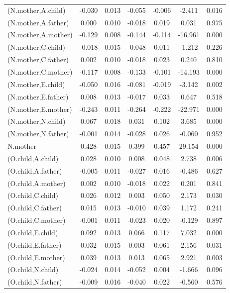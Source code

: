 \documentclass[11pt,a5paper,twoside]{book}
\begin{document}
\begin{center}
\begin{longtable}{lcccccc}
   (N.mother,A.child)  & -0.030 & 0.013 & -0.055 & -0.006 & -2.411 & 0.016 \\ 
   (N.mother,A.father)  & 0.000 & 0.010 & -0.018 & 0.019 & 0.031 & 0.975 \\ 
   (N.mother,A.mother)  & -0.129 & 0.008 & -0.144 & -0.114 & -16.961 & 0.000 \\ 
   (N.mother,C.child)  & -0.018 & 0.015 & -0.048 & 0.011 & -1.212 & 0.226 \\ 
   (N.mother,C.father)  & 0.002 & 0.010 & -0.018 & 0.023 & 0.240 & 0.810 \\ 
  (N.mother,C.mother)  & -0.117 & 0.008 & -0.133 & -0.101 & -14.193 & 0.000 \\ 
   (N.mother,E.child)  & -0.050 & 0.016 & -0.081 & -0.019 & -3.142 & 0.002 \\ 
   (N.mother,E.father)  & 0.008 & 0.013 & -0.017 & 0.033 & 0.647 & 0.518 \\ 
   (N.mother,E.mother)  & -0.243 & 0.011 & -0.264 & -0.222 & -22.971 & 0.000 \\ 
   (N.mother,N.child)  & 0.067 & 0.018 & 0.031 & 0.102 & 3.685 & 0.000 \\ 
   (N.mother,N.father)  & -0.001 & 0.014 & -0.028 & 0.026 & -0.060 & 0.952 \\ 
   N.mother  & 0.428 & 0.015 & 0.399 & 0.457 & 29.154 & 0.000 \\ 
   (O.child,A.child)  & 0.028 & 0.010 & 0.008 & 0.048 & 2.738 & 0.006 \\ 
   (O.child,A.father)  & -0.005 & 0.011 & -0.027 & 0.016 & -0.486 & 0.627 \\ 
   (O.child,A.mother)  & 0.002 & 0.010 & -0.018 & 0.022 & 0.201 & 0.841 \\ 
   (O.child,C.child)  & 0.026 & 0.012 & 0.003 & 0.050 & 2.173 & 0.030 \\ 
   (O.child,C.father)  & 0.015 & 0.013 & -0.010 & 0.039 & 1.172 & 0.241 \\ 
   (O.child,C.mother)  & -0.001 & 0.011 & -0.023 & 0.020 & -0.129 & 0.897 \\ 
   (O.child,E.child)  & 0.092 & 0.013 & 0.066 & 0.117 & 7.032 & 0.000 \\ 
   (O.child,E.father)  & 0.032 & 0.015 & 0.003 & 0.061 & 2.156 & 0.031 \\ 
   (O.child,E.mother)  & 0.039 & 0.013 & 0.013 & 0.065 & 2.921 & 0.003 \\ 
   (O.child,N.child)  & -0.024 & 0.014 & -0.052 & 0.004 & -1.666 & 0.096 \\ 
   (O.child,N.father)  & -0.009 & 0.016 & -0.040 & 0.022 & -0.560 & 0.576 \\ 

\end{longtable}
\end{center}
\end{document}
